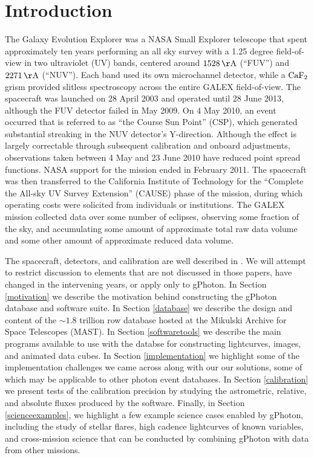 \documentclass[preprint]{aastex}
\begin{document}
\section{Introduction}
The Galaxy Evolution Explorer \citep[GALEX;][]{mar2005} was a NASA Small Explorer telescope that spent approximately ten years performing an all sky survey with a 1.25 degree field-of-view in two ultraviolet (UV) bands, centered around $1528\,\rm{\AA}$ (“FUV”) and $2271\,\rm{\AA}$ (“NUV”). Each band used its own microchannel detector, while a $\rm{CaF_{2}}$ grism provided slitless spectroscopy across the entire GALEX field-of-view. The spacecraft was launched on 28 April 2003 and operated until 28 June 2013, although the FUV detector failed in May 2009. On 4 May 2010, an event occurred that is referred to as ``the Course Sun Point'' (CSP), which generated substantial streaking in the NUV detector's Y-direction. Although the effect is largely correctable through subsequent calibration and onboard adjustments, observations taken between 4 May and 23 June 2010 have reduced point spread functions. NASA support for the mission ended in February 2011. The spacecraft was then transferred to the California Institute of Technology for the “Complete the All-sky UV Survey Extension” (CAUSE) phase of the mission, during which operating costs were solicited from individuals or institutions. The GALEX mission collected data over {\color{red}some number of eclipses}, observing {\color{red}some fraction of the sky}, and accumulating {\color{red}some amount of} approximate total raw data volume and {\color{red}some other amount of} approximate reduced data volume.

The spacecraft, detectors, and calibration are well described in \citet{mor2005,mor2007}. We will attempt to restrict discussion to elements that are not discussed in those papers, have changed in the intervening years, or apply only to gPhoton.  In Section \ref{motivation} we describe the motivation behind constructing the gPhoton database and software suite.  In Section \ref{database} we describe the design and content of the $\sim 1.8$ trillion row database hosted at the Mikulski Archive for Space Telescopes (MAST).  In Section \ref{softwaretools} we describe the main programs available to use with the databse for constructing lightcurves, images, and animated data cubes.  In Section \ref{implementation} we highlight some of the implementation challenges we came across along with our our solutions, some of which may be applicable to other photon event databases.  In Section \ref{calibration} we present tests of the calibration precision by studying the astrometric, relative, and absolute fluxes produced by the software.  Finally, in Section \ref{scienceexamples}, we highlight a few example science cases enabled by gPhoton, including the study of stellar flares, high cadence lightcurves of known variables, and cross-mission science that can be conducted by combining gPhoton with data from other missions.
\end{document}
